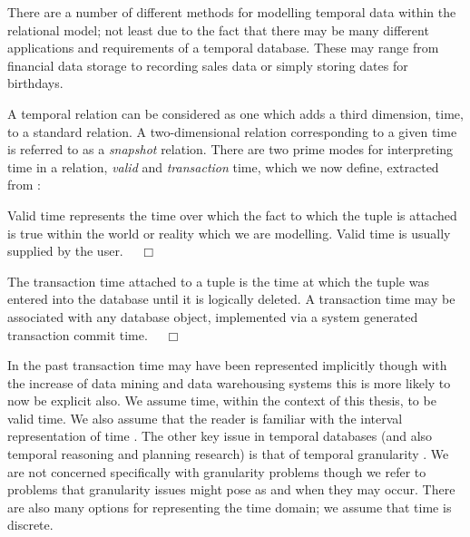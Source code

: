 There are a number of different methods for modelling temporal data
within the relational model; not least due to the fact that there may be
many different applications and requirements of a temporal
database. These may range from financial data storage to recording
sales data or simply storing dates for birthdays. 

\medskip

A temporal
relation can be considered as one which adds a third dimension, time,
to a standard relation. A two-dimensional relation corresponding to a
given time is 
referred to as a {\em snapshot} relation.
There are two prime modes for interpreting time in a relation, {\em valid}
and {\em transaction} time,  which we
now define, extracted from \cite{jdb98}:

\begin{definition}
\begin{rm}
Valid time represents the time over
which the fact to which the tuple is attached is true within the
world or reality which we are modelling. Valid time is usually
supplied by the user. $\quad\Box$
\end{rm}
\end{definition}
\smallskip


\begin{definition}
\begin{rm}
The transaction time attached to a tuple is the time at
which  the tuple was entered into the database until it is logically
deleted. A transaction time may be associated with any database
object, implemented via a system generated transaction commit
time. $\quad\Box$  
\end{rm}
\end{definition}


In the past
transaction time may
have been represented implicitly though with the increase of data
mining and data warehousing systems this is more likely to now be
explicit also.  We assume
time, within the context of this thesis, to be valid time. We also
assume that the reader is familiar with the interval representation of
time \cite{all84}. The other key issue in temporal databases (and also
temporal reasoning and planning research) is that of temporal
granularity \cite{bwj96}. We are not concerned specifically with
granularity problems though we refer to problems that granularity
issues might pose as and when they may occur. There are also many
options for representing the time domain; we assume that time is discrete.

